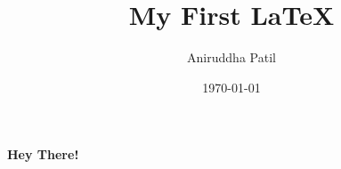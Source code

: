\documentclass[12pt]{report}
\title{ \textbf{My First} \LaTeX}
\date{\today}
\author{Aniruddha Patil}
\begin{document}
\maketitle
\textbf{Hey There!}
\end{document}

